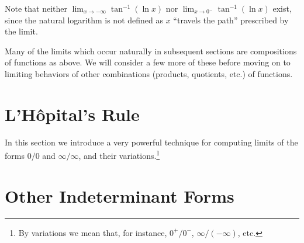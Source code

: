 Note that neither $\lim_{x\to-\infty}\tan^{-1}(\ln x)$ nor
$\lim_{x\to0^-}\tan^{-1}(\ln x)$ exist, since
the natural logarithm is not defined as $x$ ``travels the
path'' prescribed by the limit.

Many of the limits which occur naturally in subsequent sections
are compositions of functions as above.  We will consider a few
more of these before moving on to limiting behaviors of
other combinations (products, quotients, etc.) of functions.

\section{L'H\^opital's Rule\label{LHRSection}}

In this section we introduce a very powerful technique for 
computing limits of the forms $0/0$ and $\infty/\infty$,
and their variations.\footnote{%
By variations we mean that, for instance, $0^+/0^-$, $\infty/(-\infty)$,
etc.
}

 


\section{Other Indeterminant Forms}

